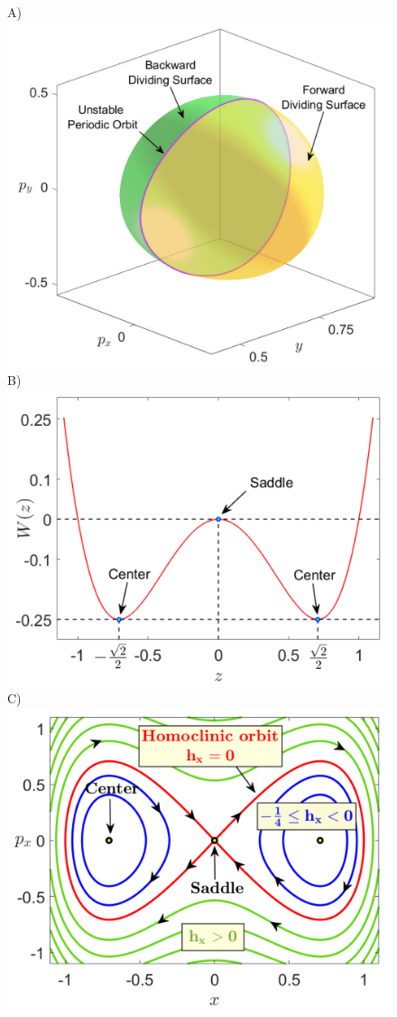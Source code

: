 \documentclass[10pt,aps,onecolumn,superscriptaddress]{revtex4-2}
\begin{document}
	\begin{figure}[htbp]
		\begin{center}
			A)\includegraphics[scale=0.25]{ds_symm} 
			B)\includegraphics[scale=0.32]{pot_symm_1D}\\
			C)\includegraphics[scale=0.32]{phasePort_symm_1D_xDoF}

\end{center}
\end{figure}
\end{document}
